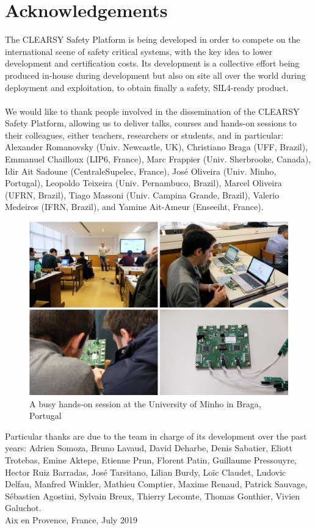 \section{Acknowledgements}
The CLEARSY Safety Platform is being developed in order to compete on the international scene of safety critical systems, with the key idea to lower development and certification costs. Its development is a collective effort being produced in-house during development but also on site all over the world during deployment and exploitation, to obtain finally a safety, SIL4-ready product.\\
\\
We would like to thank people involved in the dissemination of the CLEARSY Safety Platform, allowing us to deliver talks, courses and hands-on sessions to their colleagues, either teachers, researchers or students, and in particular: Alexander Romanovsky (Univ. Newcastle, UK), Christiano Braga (UFF, Brazil), Emmanuel Chailloux (LIP6, France), Marc Frappier (Univ. Sherbrooke, Canada), Idir Ait Sadoune (CentraleSupelec, France), José Oliveira (Univ. Minho, Portugal), Leopoldo Teixeira (Univ. Pernambuco, Brazil), Marcel Oliveira (UFRN, Brazil), Tiago Massoni (Univ. Campina Grande, Brazil), Valerio Medeiros (IFRN, Brazil), and Yamine Ait-Ameur (Enseeiht, France). \\

\begin{figure}[h]
\centering\includegraphics[scale=0.3]{Pictures/FOREWORD-TALK.jpg}
\caption{A busy hands-on session at the University of Minho in Braga, Portugal}
\end{figure}


Particular thanks are due to the team in charge of its development over the past years: Adrien Somoza, Bruno Lavaud, David Deharbe, Denis Sabatier, Eliott Trotebas, Emine Aktepe, Etienne Prun, Florent Patin, Guillaume Pressouyre, Hector Ruiz Barradas, José Tarsitano, Lilian Burdy, Loïc Claudet, Ludovic Delfau, Manfred Winkler, Mathieu Comptier, Maxime Renaud, Patrick Sauvage, Sébastien Agostini, Sylvain Breux, Thierry Lecomte, Thomas Gonthier, Vivien Galuchot.\\

%
\hspace*{\fill} Aix en Provence, France, July 2019
